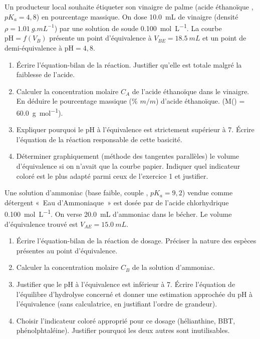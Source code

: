 \documentclass[11pt]{article}
\begin{document}
\begin{exercice}
Un producteur local souhaite étiqueter son vinaigre de palme (acide éthanoïque , $pK_a = 4,8$) en pourcentage massique. On dose \SI{10,0}{mL} de vinaigre (densité $\rho = \SI{1,01}{g.mL^{-1}}$) par une solution de soude  \SI{0,100}{mol.L^{-1}}. La courbe $\text{pH} = f(V_B)$ présente un point d'équivalence à $V_{BE} = \SI{18,5}{mL}$ et un point de demi-équivalence à $\text{pH} = 4,8$.
\begin{enumerate}
    \item Écrire l'équation-bilan de la réaction. Justifier qu'elle est totale malgré la faiblesse de l'acide.
    \item Calculer la concentration molaire $C_A$ de l'acide éthanoïque dans le vinaigre. En déduire le pourcentage massique (\% $m/m$) d'acide éthanoïque. (M() = \SI{60,0}{g.mol^{-1}}).
    \item Expliquer pourquoi le pH à l'équivalence est strictement supérieur à 7. Écrire l'équation de la réaction responsable de cette basicité.
    \item Déterminer graphiquement (méthode des tangentes parallèles) le volume d'équivalence si on n'avait que la courbe papier. Indiquer quel indicateur coloré est le plus adapté parmi ceux de l'exercice 1 et justifier.
\end{enumerate}
\end{exercice}

\begin{exercice}
Une solution d'ammoniac  (base faible, couple , $pK_a = 9,2$) vendue comme détergent «~Eau d'Ammoniaque~» est dosée par de l'acide chlorhydrique  \SI{0,100}{mol.L^{-1}}. On verse \SI{20,0}{mL} d'ammoniac dans le bécher. Le volume d'équivalence trouvé est $V_{AE} = \SI{15,0}{mL}$.
\begin{enumerate}
    \item Écrire l'équation-bilan de la réaction de dosage. Préciser la nature des espèces présentes au point d'équivalence.
    \item Calculer la concentration molaire $C_B$ de la solution d'ammoniac.
    \item Justifier que le pH à l'équivalence est inférieur à 7. Écrire l'équation de l'équilibre d'hydrolyse concerné et donner une estimation approchée du pH à l'équivalence (sans calculatrice, en justifiant l'ordre de grandeur).
    \item Choisir l'indicateur coloré approprié pour ce dosage (hélianthine, BBT, phénolphtaléine). Justifier pourquoi les deux autres sont inutilisables.
\end{enumerate}
\end{exercice}
\end{document}
